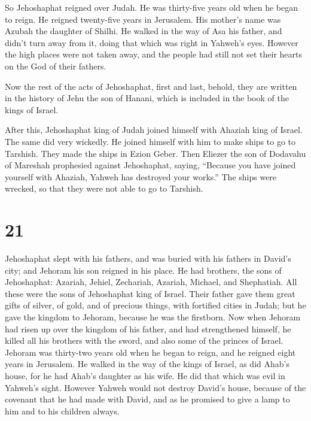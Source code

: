  So Jehoshaphat reigned over Judah. He was thirty-five
years old when he began to reign. He reigned twenty-five years in
Jerusalem. His mother's name was Azubah the daughter of Shilhi.
 He walked in the way of Asa his father, and didn't turn
away from it, doing that which was right in Yahweh's eyes.
 However the high places were not taken away, and the
people had still not set their hearts on the God of their fathers.

 Now the rest of the acts of Jehoshaphat, first and last,
behold, they are written in the history of Jehu the son of Hanani, which
is included in the book of the kings of Israel.

 After this, Jehoshaphat king of Judah joined himself
with Ahaziah king of Israel. The same did very wickedly. 
He joined himself with him to make ships to go to Tarshish. They made
the ships in Ezion Geber.  Then Eliezer the son of
Dodavahu of Mareshah prophesied against Jehoshaphat, saying, ``Because
you have joined yourself with Ahaziah, Yahweh has destroyed your
works.'' The ships were wrecked, so that they were not able to go to
Tarshish.

\hypertarget{section-20}{%
\section{21}\label{section-20}}

 Jehoshaphat slept with his fathers, and was buried with
his fathers in David's city; and Jehoram his son reigned in his place.
 He had brothers, the sons of Jehoshaphat: Azariah,
Jehiel, Zechariah, Azariah, Michael, and Shephatiah. All these were the
sons of Jehoshaphat king of Israel.  Their father gave
them great gifts of silver, of gold, and of precious things, with
fortified cities in Judah; but he gave the kingdom to Jehoram, because
he was the firstborn.  Now when Jehoram had risen up over
the kingdom of his father, and had strengthened himself, he killed all
his brothers with the sword, and also some of the princes of Israel.
 Jehoram was thirty-two years old when he began to reign,
and he reigned eight years in Jerusalem.  He walked in the
way of the kings of Israel, as did Ahab's house, for he had Ahab's
daughter as his wife. He did that which was evil in Yahweh's sight.
 However Yahweh would not destroy David's house, because
of the covenant that he had made with David, and as he promised to give
a lamp to him and to his children always.

